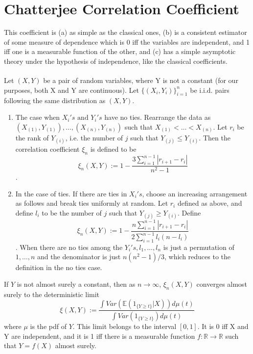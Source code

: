 \section{Chatterjee Correlation Coefficient}
This coefficient is (a) as simple as the classical ones, (b) is a consistent estimator of some measure of dependence which is 0 iff the variables are independent, and 1 iff one is a measurable function of the other, and (c) has a simple asymptotic theory under the hypothesis of independence, like the classical coefficients. \\\\
Let $(X, Y)$ be a pair of random variables, where Y is not a constant (for our purposes, both X and Y are continuous). Let $\{(X_i, Y_i)\}_{i = 1}^{n}$ be i.i.d. pairs following the same distribution as $(X, Y)$.
\begin{enumerate}
    \item The case when $X_i's \text{ and } Y_i's$ have no ties. Rearrange the data as $(X_{(1)}, Y_{(1)}), \dots, (X_{(n)}, Y_{(n)})$ such that $X_{(1)} < \dots < X_{(n)}$. Let $r_i$ be the rank of $Y_{(i)}$, i.e. the number of $j$ such that $Y_{(j)} \leq Y_{(i)}$.  Then the correlation coefficient $\xi_n$ is defined to be
    $$\xi_n(X, Y) := 1-\frac{3\sum_{i=1}^{n-1} |r_{i+1} - r_i|}{n^2-1}$$.

    \item In the case of ties. If there are ties in $X_i's$, choose an increasing arrangement as follows and break ties uniformly at random. Let $r_i$ defined as above, and define $l_i$ to be the number of $j$ such that $Y_{(j)} \geq Y_{(i)}$. Define
    $$\xi_n(X, Y) := 1-\frac{n\sum_{i=1}^{n-1} |r_{i+1} - r_i|}{2\sum_{i=1}^{n-1}l_i(n-l_i)}$$.
    When there are no ties among the $Y_i's, l_1, \dots, l_n$ is just a permutation of $1, \dots, n$ and the denominator is just $n(n^2-1)/3$, which reduces to the definition in the no ties case.
\end{enumerate}

\begin{theorem}
If $Y$ is not almost surely a constant, then as $n \rightarrow \infty$, $\xi_n(X, Y)$ converges almost surely to the deterministic limit
$$\xi(X, Y) := \frac{\int Var(\mathbb{E}(1_{\{Y \geq t\}}|X)) d\mu(t)}{\int Var(1_{\{Y \geq t\}}) d\mu(t)}$$
where $\mu$ is the pdf of $Y$. This limit belongs to the interval $[0, 1]$. It is 0 iff X and Y are independent, and it is 1 iff there is a measurable function $f:\mathbb{R} \rightarrow \mathbb{R}$ such that $Y = f(X)$ almost surely.
\end{theorem}

